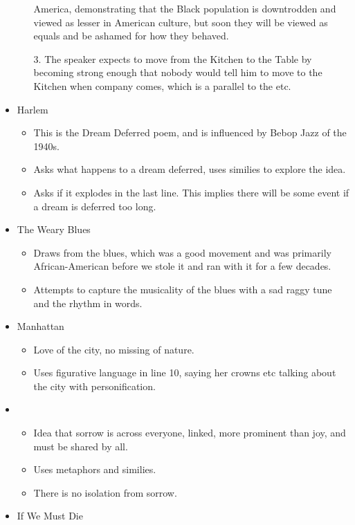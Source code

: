 \documentclass[10pt]{article}
\begin{document}
\begin{itemize}
\begin{itemize}
				America, demonstrating that the Black
				population is downtrodden and viewed as
				lesser in American culture, but soon they
				will be viewed as equals and be ashamed
				for how they behaved.
			\item[3. ] The speaker expects to move 
				from the Kitchen to the Table by becoming
				strong enough that nobody would tell him
				to move to the Kitchen when company comes,
				which is a parallel to the etc.
		\end{itemize}
	\item Harlem
		\begin{itemize}
			\item This is the Dream Deferred poem, and
				is influenced by Bebop Jazz of the 1940s.
			\item Asks what happens to a dream deferred,
				uses similies to explore the idea.
			\item Asks if it explodes in the last line.
				This implies there will be some event if
				a dream is deferred too long.
		\end{itemize}
	\item The Weary Blues
		\begin{itemize}
			\item Draws from the blues, which was a good
				movement and was primarily African-American
				before we stole it and ran with it for a 
				few decades.
			\item Attempts to capture the musicality of
				the blues with a sad raggy tune and the 
				rhythm in words.
		\end{itemize}
	\item Manhattan
		\begin{itemize}
			\item Love of the city, no missing of nature.
			\item Uses figurative language in line 10,
				saying her crowns etc talking about the 
				city with personification.
		\end{itemize}
	\item
		\begin{itemize}
			\item Idea that sorrow is across everyone,
				linked, more prominent than joy, and must
				be shared by all.
			\item Uses metaphors and similies.
			\item There is no isolation from sorrow.
		\end{itemize}
	\item If We Must Die
		\begin{itemize}

\end{itemize}
\end{itemize}
\end{document}
